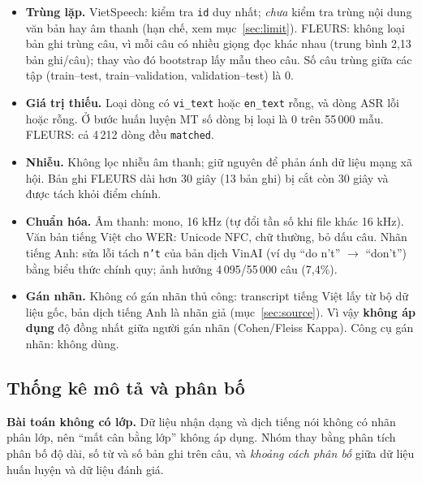 \documentclass[12pt,a4paper]{article}
\begin{document}
\begin{itemize}[nosep]
\item \textbf{Trùng lặp.} VietSpeech: kiểm tra \texttt{id} duy nhất; \emph{chưa} kiểm tra trùng nội dung văn bản hay âm thanh (hạn chế, xem mục~\ref{sec:limit}). FLEURS: không loại bản ghi trùng câu, vì mỗi câu có nhiều giọng đọc khác nhau (trung bình 2,13 bản ghi/câu); thay vào đó bootstrap lấy mẫu theo câu. Số câu trùng giữa các tập (train--test, train--validation, validation--test) là 0.
\item \textbf{Giá trị thiếu.} Loại dòng có \texttt{vi\_text} hoặc \texttt{en\_text} rỗng, và dòng ASR lỗi hoặc rỗng. Ở bước huấn luyện MT số dòng bị loại là 0 trên 55\,000 mẫu. FLEURS: cả 4\,212 dòng đều \texttt{matched}.
\item \textbf{Nhiễu.} Không lọc nhiễu âm thanh; giữ nguyên để phản ánh dữ liệu mạng xã hội. Bản ghi FLEURS dài hơn 30 giây (13 bản ghi) bị cắt còn 30 giây và được tách khỏi điểm chính.
\item \textbf{Chuẩn hóa.} Âm thanh: mono, 16 kHz (tự đổi tần số khi file khác 16 kHz). Văn bản tiếng Việt cho WER: Unicode NFC, chữ thường, bỏ dấu câu. Nhãn tiếng Anh: sửa lỗi tách \texttt{n't} của bản dịch VinAI (ví dụ ``do n't'' $\rightarrow$ ``don't'') bằng biểu thức chính quy; ảnh hưởng 4\,095/55\,000 câu (7,4\%).
\item \textbf{Gán nhãn.} Không có gán nhãn thủ công: transcript tiếng Việt lấy từ bộ dữ liệu gốc, bản dịch tiếng Anh là nhãn giả (mục~\ref{sec:source}). Vì vậy \textbf{không áp dụng} độ đồng nhất giữa người gán nhãn (Cohen/Fleiss Kappa). Công cụ gán nhãn: không dùng.
\end{itemize}

\subsection{Thống kê mô tả và phân bố}\label{sec:stats}
\textbf{Bài toán không có lớp.} Dữ liệu nhận dạng và dịch tiếng nói không có nhãn phân lớp, nên ``mất cân bằng lớp'' không áp dụng. Nhóm thay bằng phân tích phân bố độ dài, số từ và số bản ghi trên câu, và \emph{khoảng cách phân bố} giữa dữ liệu huấn luyện và dữ liệu đánh giá.
\end{document}
